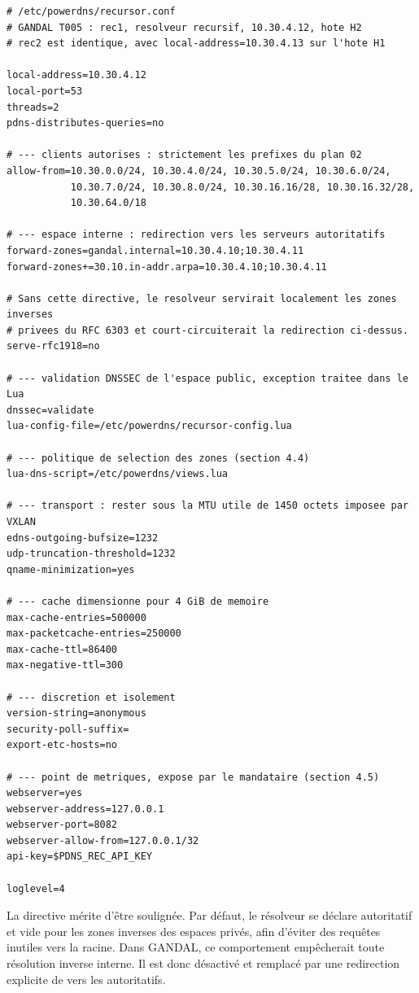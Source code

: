 \begin{lstlisting}[language=pdnsconf,caption={Configuration du résolveur
  récursif rec1},label=lst:rec1]
# /etc/powerdns/recursor.conf
# GANDAL T005 : rec1, resolveur recursif, 10.30.4.12, hote H2
# rec2 est identique, avec local-address=10.30.4.13 sur l'hote H1

local-address=10.30.4.12
local-port=53
threads=2
pdns-distributes-queries=no

# --- clients autorises : strictement les prefixes du plan 02
allow-from=10.30.0.0/24, 10.30.4.0/24, 10.30.5.0/24, 10.30.6.0/24,
           10.30.7.0/24, 10.30.8.0/24, 10.30.16.16/28, 10.30.16.32/28,
           10.30.64.0/18

# --- espace interne : redirection vers les serveurs autoritatifs
forward-zones=gandal.internal=10.30.4.10;10.30.4.11
forward-zones+=30.10.in-addr.arpa=10.30.4.10;10.30.4.11

# Sans cette directive, le resolveur servirait localement les zones inverses
# privees du RFC 6303 et court-circuiterait la redirection ci-dessus.
serve-rfc1918=no

# --- validation DNSSEC de l'espace public, exception traitee dans le Lua
dnssec=validate
lua-config-file=/etc/powerdns/recursor-config.lua

# --- politique de selection des zones (section 4.4)
lua-dns-script=/etc/powerdns/views.lua

# --- transport : rester sous la MTU utile de 1450 octets imposee par VXLAN
edns-outgoing-bufsize=1232
udp-truncation-threshold=1232
qname-minimization=yes

# --- cache dimensionne pour 4 GiB de memoire
max-cache-entries=500000
max-packetcache-entries=250000
max-cache-ttl=86400
max-negative-ttl=300

# --- discretion et isolement
version-string=anonymous
security-poll-suffix=
export-etc-hosts=no

# --- point de metriques, expose par le mandataire (section 4.5)
webserver=yes
webserver-address=127.0.0.1
webserver-port=8082
webserver-allow-from=127.0.0.1/32
api-key=$PDNS_REC_API_KEY

loglevel=4
\end{lstlisting}

La directive  mérite d'être soulignée. Par défaut, le
résolveur se déclare autoritatif et vide pour les zones inverses des espaces
privés, afin d'éviter des requêtes inutiles vers la racine. Dans GANDAL, ce
comportement empêcherait toute résolution inverse interne. Il est donc désactivé
et remplacé par une redirection explicite de  vers les
autoritatifs.

